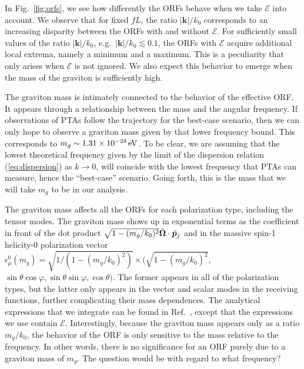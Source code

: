\documentclass[prd,twocolumn,aps,psfig,nofootinbib,nobibnotes,superscriptaddress,preprintnumbers,times]{revtex4-2}
\newcommand{\eV}{\,{\rm eV}}
\begin{document}
In Fig.~\ref{fig:orfs}, we see how differently the ORFs behave when we take $\mathcal{E}$ into account. We observe that for fixed $fL$, the ratio $|\boldsymbol{k}|/k_0$ corresponds to an increasing disparity between the ORFs with and without $\mathcal{E}$. For sufficiently small values of the ratio $|\boldsymbol{k}|/k_0$, e.g.\ $|\boldsymbol{k}|/k_0 \lesssim 0.1$, the ORFs with $\mathcal{E}$ acquire additional local extrema, namely a minimum and a maximum. This is a peculiarity that only arises when $\mathcal{E}$ is not ignored. We also expect this behavior to emerge when the mass of the graviton is sufficiently high.

The graviton mass is intimately connected to the behavior of the effective ORF. It appears through a relationship between the mass and the angular frequency. 
If observations of PTAs follow the trajectory for the best-case scenario, then we can only hope to observe a graviton mass given by that lower frequency bound. This corresponds to $m_g \sim 1.31\times 10^{-24} \eV$. To be clear, we are assuming that the lowest theoretical frequency given by the limit of the dispersion relation (\ref{eq:dispersion}) as $k\rightarrow 0$, will coincide with the lowest frequency that PTAs can measure, hence the ``best-case'' scenario. Going forth, this is the mass that we will take $m_g$ to be in our analysis.

The graviton mass affects all the ORFs for each polarization type, including the tensor modes. The graviton mass shows up in exponential terms as the coefficient in front of the dot product $\sqrt{1 - (m_g/k_0)^2}\hat{\bf \Omega}\cdot \hat{\boldsymbol{p}}_j$ and in the massive spin-1 helicity-0 polarization vector $\epsilon_\mu^0(m_g) = \sqrt{1 / (1 - (m_g/k_0)^2)}\times (\sqrt{1 - (m_g/k_0)^2},$ $\sin\theta\cos\varphi, \sin\theta\sin\varphi, \cos\theta)$. The former appears in all of the polarization types, but the latter only appears in the vector and scalar modes in the receiving functions, further complicating their mass dependences. The analytical expressions that we integrate can be found in Ref.~\cite{Liang:2021bct}, except that the expressions we use contain $\mathcal{E}$. Interestingly, because the graviton mass appears only as a ratio $m_g / k_0$, the behavior of the ORF is only sensitive to the mass relative to the frequency. In other words, there is no significance for an ORF purely due to a graviton mass of $m_g$. The question would be with regard to what frequency?
\end{document}
